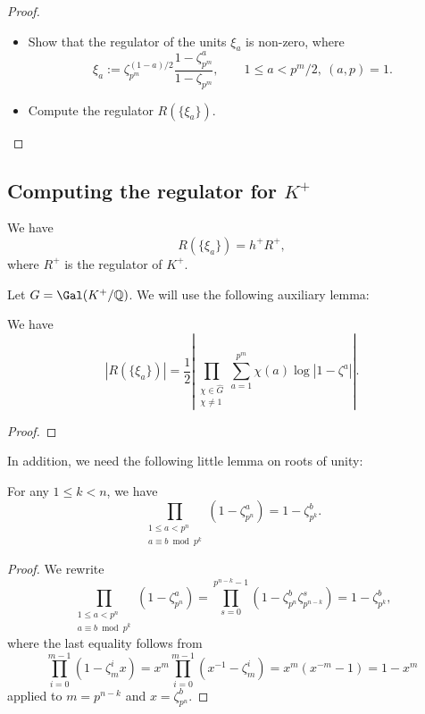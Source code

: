 \begin{proof}
    \begin{itemize}
        \item Show that the regulator of the units $\xi_a$ is non-zero, where 
        $$
        \xi_a := \zeta_{p^m}^{(1-a)/2} \frac{1 - \zeta_{p^m}^a}{1 - \zeta_{p^m}}, \qquad 1 \leq a < p^m / 2, \ (a, p) = 1.
        $$
        \item Compute the regulator $R(\{\xi_a\})$. 
    \end{itemize}
\end{proof}

\subsection{Computing the regulator for $K^+$}

\begin{lemma}\label{lem:reg_Ra}
    We have
    $$
    R(\{\xi_a\}) = h^+ R^+, 
    $$
    where $R^+$ is the regulator of $K^+$.
\end{lemma}

Let $G = \Gal(K^+ / \mathbb{Q})$. We will use the following auxiliary lemma:

\begin{lemma}\label{lem:reg_Ra_charsum}
    We have 
    $$
    | R(\{\xi_a\}) | = \frac{1}{2} \left | \prod_{\substack{\chi \in \widehat{G} \\ \chi \ne 1}} \sum_{a = 1}^{p^m} \chi(a) \log |1 - \zeta^a| \right |. 
    $$
\end{lemma}

\begin{proof}
\end{proof}

In addition, we need the following little lemma on roots of unity: 

\begin{lemma}\label{lem:prod_cycl_units}
    For any $1 \leq k < n$, we have 
    $$
    \prod_{\substack{1 \leq a < p^n \\ a \equiv b \bmod p^k}} (1 - \zeta_{p^n}^a) = 1 - \zeta_{p^k}^b.   
    $$
\end{lemma}

\begin{proof}
    We rewrite 
    $$
    \prod_{\substack{1 \leq a < p^n \\ a \equiv b \bmod p^k}} (1 - \zeta_{p^n}^a) = \prod_{s = 0}^{p^{n-k}-1}(1 - \zeta_{p^n}^b \zeta_{p^{n-k}}^s) = 1 - \zeta_{p^k}^b,
    $$
    where the last equality follows from  
    $$
    \prod_{i = 0}^{m-1} (1 - \zeta_m^i x)= x^m \prod_{i = 0}^{m-1} (x^{-1} - \zeta_m^i) = x^m (x^{-m} - 1) = 1 - x^m
    $$
    applied to $m = p^{n-k}$ and $x = \zeta_{p^n}^b$. 
\end{proof}

